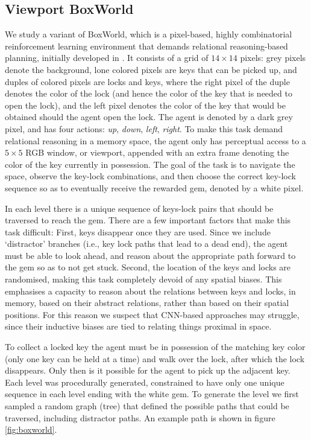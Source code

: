 \documentclass{article}
\begin{document}
\subsection{Viewport BoxWorld}
We study a variant of BoxWorld, which is a pixel-based, highly combinatorial reinforcement learning environment that demands relational reasoning-based planning, initially developed in \cite{zambaldi2018relational}. It consists of a grid of $14 \times 14$ pixels: grey pixels denote the background, lone colored pixels are keys that can be picked up, and duples of colored pixels are locks and keys, where the right pixel of the duple denotes the color of the lock (and hence the color of the key that is needed to open the lock), and the left pixel denotes the color of the key that would be obtained should the agent open the lock. The agent is denoted by a dark grey pixel, and has four actions: \textit{up}, \textit{down}, \textit{left}, \textit{right}. To make this task demand relational reasoning in a memory space, the agent only has perceptual access to a $5 \times 5$ RGB window, or viewport, appended with an extra frame denoting the color of the key currently in possession. The goal of the task is to navigate the space, observe the key-lock combinations, and then choose the correct key-lock sequence so as to eventually receive the rewarded gem, denoted by a white pixel. 

In each level there is a unique sequence of keys-lock pairs that should be traversed to reach the gem. There are a few important factors that make this task difficult: First, keys disappear once they are used. Since we include `distractor' branches (i.e., key lock paths that lead to a dead end), the agent must be able to look ahead, and reason about the appropriate path forward to the gem so as to not get stuck. Second, the location of the keys and locks are randomised, making this task completely devoid of any spatial biases. This emphasises a capacity to reason about the relations between keys and locks, in memory, based on their abstract relations, rather than based on their spatial positions. For this reason we suspect that CNN-based approaches may struggle, since their inductive biases are tied to relating things proximal in space. 

To collect a locked key the agent must be in possession of the matching key color (only one key can be held at a time) and walk over the lock, after which the lock disappears. Only then is it possible for the agent to pick up the adjacent key. Each level was procedurally generated, constrained to have only one unique sequence in each level ending with the white gem. To generate the level we first sampled a random graph (tree) that defined the possible paths that could be traversed, including distractor paths. An example path is shown in figure \ref{fig:boxworld}.
\end{document}
